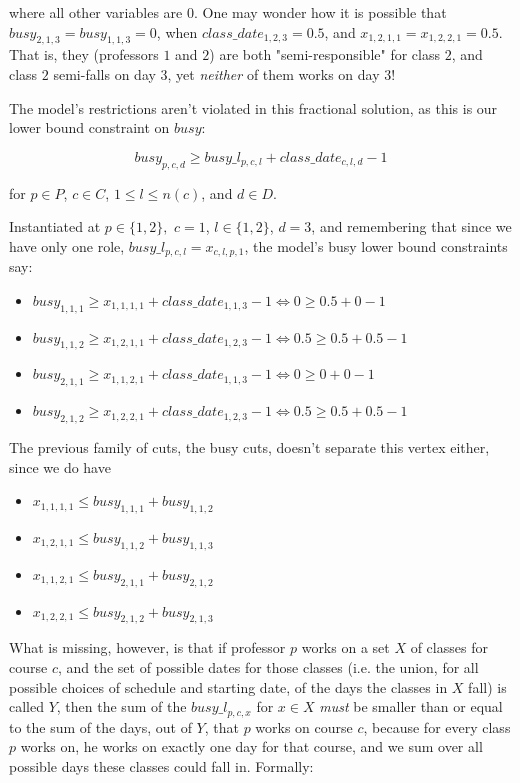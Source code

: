 where all other variables are $0$. One may wonder how it is possible that $busy_{2, 1, 3} = busy_{1, 1, 3} =  0$, when $class\_date_{1, 2, 3} = 0.5$, and $x_{1, 2, 1, 1} = x_{1, 2, 2, 1} = 0.5$. That is, they (professors $1$ and $2$) are both "semi-responsible" for class $2$, and class $2$ semi-falls on day $3$, yet \emph{neither} of them works on day $3$!

The model's restrictions aren't violated in this fractional solution, as this is our lower bound constraint on $busy$:

$$
busy_{p, c, d} \ge busy\_l_{p, c, l} + class\_date_{c, l, d} - 1
$$

for $p \in P$, $c \in C$, $1 \le l \le n(c)$, and $d \in D$.

Instantiated at $p \in \{1, 2\},$ $c = 1$, $l \in \{1, 2\}$, $d = 3$, and remembering that since we have only one role, $busy\_l_{p, c, l} = x_{c, l, p, 1}$, the model's busy lower bound constraints say:

\begin{itemize}
\item $busy_{1, 1, 1} \ge x_{1, 1, 1, 1} + class\_date_{1, 1, 3} - 1 \iff 0 \ge 0.5 + 0 - 1$ \greencheck
\item $busy_{1, 1, 2} \ge x_{1, 2, 1, 1} + class\_date_{1, 2, 3} - 1 \iff 0.5 \ge 0.5 + 0.5 - 1$ \greencheck
\item $busy_{2, 1, 1} \ge x_{1, 1, 2, 1} + class\_date_{1, 1, 3} - 1 \iff 0 \ge 0 + 0 - 1$ \greencheck
\item $busy_{2, 1, 2} \ge x_{1, 2, 2, 1} + class\_date_{1, 2, 3} - 1 \iff 0.5 \ge 0.5 + 0.5 - 1$ \greencheck
\end{itemize}

The previous family of cuts, the busy cuts, doesn't separate this vertex either, since we do have 
\begin{itemize}
\item $x_{1, 1, 1, 1} \le busy_{1, 1, 1} + busy_{1, 1, 2}$ \greencheck
\item $x_{1, 2, 1, 1} \le busy_{1, 1, 2} + busy_{1, 1, 3}$ \greencheck
\item $x_{1, 1, 2, 1} \le busy_{2, 1, 1} + busy_{2, 1, 2}$ \greencheck
\item $x_{1, 2, 2, 1} \le busy_{2, 1, 2} + busy_{2, 1, 3}$ \greencheck
\end{itemize}

What is missing, however, is that if professor $p$ works on a set $X$ of classes for course $c$, and the set of possible dates for those classes (i.e. the union, for all possible choices of schedule and starting date, of the days the classes in $X$ fall) is called $Y$, then the sum of the $busy\_l_{p, c, x}$ for $x \in X$ \emph{must} be smaller than or equal to the sum of the days, out of $Y$, that $p$ works on course $c$, because for every class $p$ works on, he works on exactly one day for that course, and we sum over all possible days these classes could fall in. Formally:

